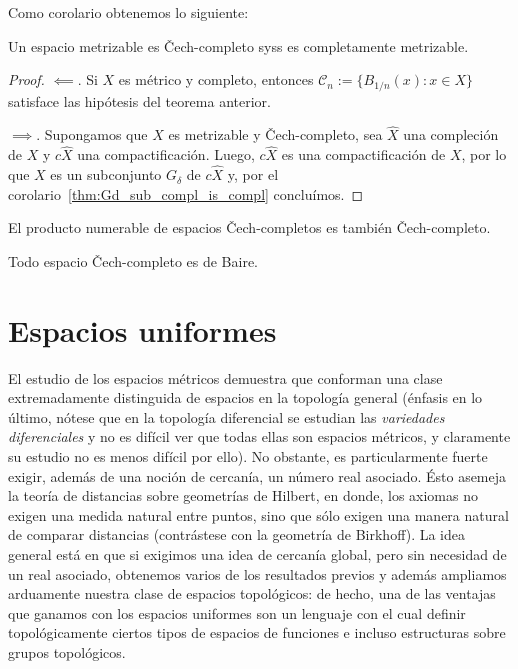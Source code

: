\documentclass[topologia-analisis.tex]{subfiles}
\begin{document}
\begin{advanced}
Como corolario obtenemos lo siguiente:
\begin{thm}
	Un espacio metrizable es \v Cech-completo syss es completamente metrizable.
\end{thm}
\begin{proof}
	$\impliedby$.
	Si $X$ es métrico y completo, entonces $\mathcal{C}_n := \{ B_{1/n}(x) : x \in X \}$ satisface las hipótesis del teorema anterior.

	$\implies$.
	Supongamos que $X$ es metrizable y \v Cech-completo, sea $\widehat{X}$ una compleción de $X$ y $c\widehat{X}$ una compactificación.
	Luego, $c \widehat{X}$ es una compactificación de $X$, por lo que $X$ es un subconjunto $G_\delta$ de $c\widehat{X}$ y,
	por el corolario~\ref{thm:Gd_sub_compl_is_compl} concluímos.
\end{proof}

\begin{prop}
	El producto numerable de espacios \v Cech-completos es también \v Cech-completo.
\end{prop}

\begin{thmi}
	Todo espacio \v Cech-completo es de Baire.
\end{thmi}
\end{advanced}

\section{Espacios uniformes}
El estudio de los espacios métricos demuestra que conforman una clase extremadamente distinguida de espacios en la topología general (énfasis en lo último,
nótese que en la topología diferencial se estudian las \textit{variedades diferenciales} y no es difícil ver que todas ellas son espacios métricos, y claramente
su estudio no es menos difícil por ello). No obstante, es particularmente fuerte exigir, además de una noción de cercanía, un número real asociado.
Ésto asemeja la teoría de distancias sobre geometrías de Hilbert, en donde, los axiomas no exigen una medida natural entre puntos, sino que sólo exigen
una manera natural de comparar distancias (contrástese con la geometría de Birkhoff).
La idea general está en que si exigimos una idea de cercanía global, pero sin necesidad de un real asociado, obtenemos varios de los resultados previos
y además ampliamos arduamente nuestra clase de espacios topológicos: de hecho, una de las ventajas que ganamos con los espacios uniformes son un lenguaje
con el cual definir topológicamente ciertos tipos de espacios de funciones e incluso estructuras sobre grupos topológicos.
\end{document}
